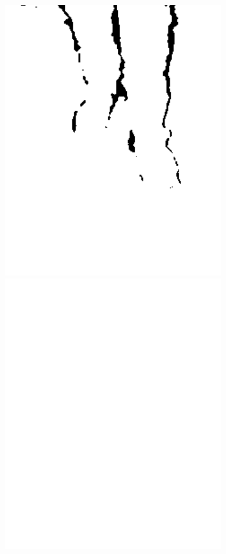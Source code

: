 \documentclass[a4paper]{report}
\begin{document}
\begin{figure}[H]
\centering
\begin{minipage}{.5\textwidth}
  \centering
    \includegraphics[width=0.85\textwidth]{images/building/compensated_max_legs.png}
\end{minipage}%
\begin{minipage}{.5\textwidth}
  \centering
    \includegraphics[width=0.85\textwidth]{images/building/compensated_max_feet.png}
\end{minipage}%
\end{figure}
\end{document}
